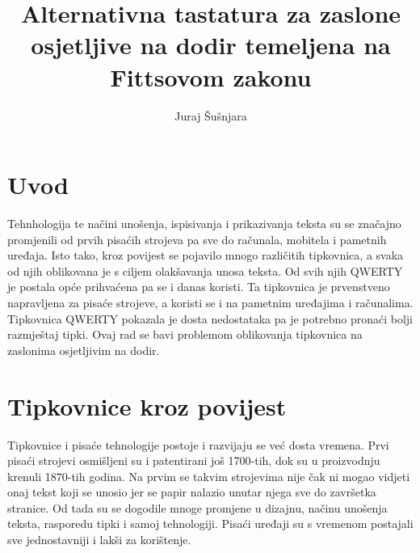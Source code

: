 \documentclass[times, utf8, zavrsni, numeric]{fer}
\begin{document}

\title{Alternativna tastatura za zaslone osjetljive na dodir temeljena na Fittsovom zakonu}

\author{Juraj Šušnjara}

\maketitle

\izvornik

\zahvala{}

\tableofcontents

\chapter{Uvod}

Tehnhologija te načini unošenja, ispisivanja i prikazivanja teksta su se značajno promjenili od prvih pisaćih strojeva pa sve do računala, mobitela i pametnih uređaja. Isto tako, kroz povijest se pojavilo mnogo različitih tipkovnica, a svaka od njih oblikovana je s ciljem olakšavanja unosa teksta. Od svih njih QWERTY je postala opće prihvaćena pa se i danas koristi. Ta tipkovnica je prvenstveno napravljena za pisaće strojeve, a koristi se i na pametnim uređajima i računalima. Tipkovnica QWERTY pokazala je dosta nedostataka pa je potrebno pronaći bolji razmještaj tipki. Ovaj rad se bavi problemom oblikovanja tipkovnica na zaslonima osjetljivim na dodir. 

\chapter{Tipkovnice kroz povijest}

Tipkovnice i pisaće tehnologije postoje i razvijaju se već dosta vremena. Prvi pisaći strojevi osmišljeni su i patentirani još 1700-tih, dok su u proizvodnju krenuli 1870-tih godina. Na prvim se takvim strojevima nije čak ni mogao vidjeti onaj tekst koji se unosio jer se papir nalazio unutar njega sve do završetka stranice. Od tada su se dogodile mnoge promjene u dizajnu, načinu unošenja teksta, rasporedu tipki i samoj tehnologiji. Pisaći uređaji su s vremenom postajali sve jednostavniji i lakši za korištenje.
\end{document}
